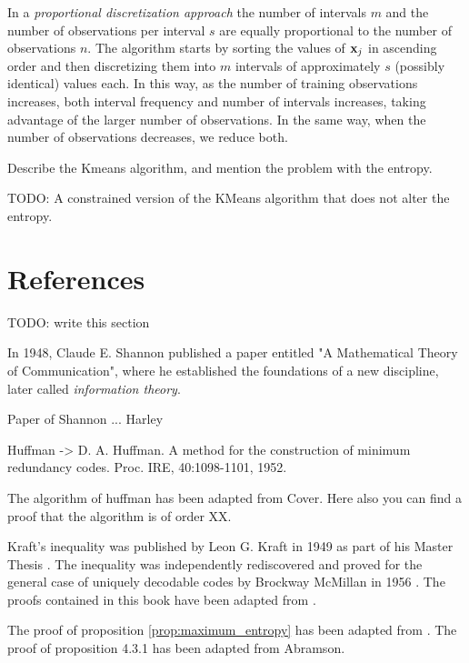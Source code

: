 In a \emph{proportional discretization approach} the number of intervals $m$ and the number of observations per interval $s$ are equally proportional to the number of observations $n$. The algorithm starts by sorting the values of $\bold{x}_j$ in ascending order and then discretizing them into $m$ intervals of approximately $s$ (possibly identical) values each. In this way, as the number of training observations increases, both interval frequency and number of intervals increases, taking advantage of the larger number of observations. In the same way, when the number of observations decreases, we reduce both.

{\color{red} Describe the Kmeans algorithm, and mention the problem with the entropy.}

\begin{remark}
{\color{red} TODO: A constrained version of the KMeans algorithm that does not alter the entropy.}
\end{remark}

\section*{References}

{\color{red} TODO: write this section}

In 1948, Claude E. Shannon published a paper entitled "A Mathematical Theory of Communication", where he established the foundations of a new discipline, later called \emph{information theory}.

Paper of Shannon ... Harley

Huffman -> D. A. Huffman. A method for the construction of minimum redundancy codes. Proc. IRE, 40:1098-1101, 1952.

The algorithm of huffman has been adapted from Cover. Here also you can find a proof that the algorithm is of order XX. 

Kraft's inequality was published by Leon G. Kraft in 1949 as part of his Master Thesis \cite{kraft1949device}. The inequality was independently rediscovered and proved for the general case of uniquely decodable codes by Brockway McMillan in 1956 \cite{mcmillan1956two}. The proofs contained in this book have been adapted from \cite{cover2012elements}.


The proof of proposition \ref{prop:maximum_entropy} has been adapted from \cite{abramson1963information}.
The proof of proposition 4.3.1 has been adapted from Abramson.

